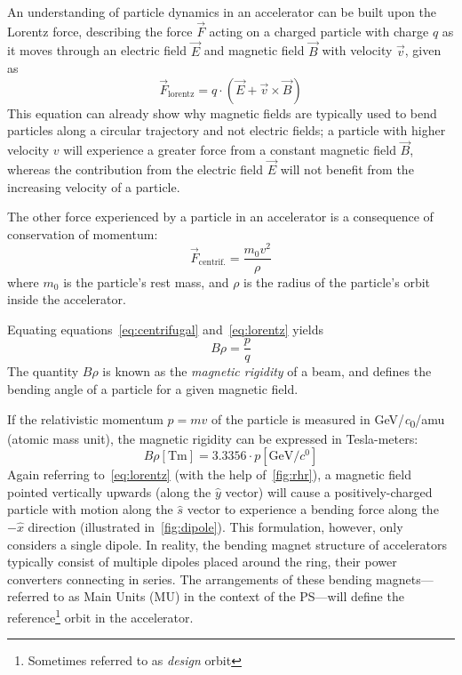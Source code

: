 \documentclass[11pt]{report}
\begin{document}
An understanding of particle dynamics in an accelerator can be built upon the Lorentz force, describing the force $\vec F$ acting on a charged particle with charge $q$ as it moves through an electric field $\vec E$ and magnetic field $\vec B$ with velocity $\vec v$, given as
\begin{equation}
\vec F_{\text{lorentz}} = q\cdot(\vec E+ \vec v\times\vec B)\label{eq:lorentz}
\end{equation}
This equation can already show why magnetic fields are typically used to bend particles along a circular trajectory and not electric fields; a particle with higher velocity $v$ will experience a greater force from a constant magnetic field $\vec B$, whereas the contribution from the electric field $\vec E$ will not benefit from the increasing velocity of a particle.

The other force experienced by a particle in an accelerator is a consequence of conservation of momentum:
\begin{equation}
\vec F_{\text{centrif.}}=\frac{m_0v^2}{\rho}\label{eq:centrifugal}
\end{equation} where $m_0$ is the particle's rest mass, and $\rho$ is the radius of the particle's orbit inside the accelerator.

Equating equations~\ref{eq:centrifugal} and~\ref{eq:lorentz} yields
\begin{equation}
B\rho=\frac pq
\label{eq:brho}
\end{equation}
The quantity $B\rho$ is known as the \textit{magnetic rigidity} of a beam, and defines the bending angle of a particle for a given magnetic field. 

If the relativistic momentum $p=mv$ of the particle is measured in \unit[per-mode = symbol]{\GeV\per\clight\per amu} (atomic mass unit), the magnetic rigidity can be expressed in Tesla-meters:
\begin{equation}
B\rho \left[\unit{\tesla\meter}\right] = 3.3356\cdot p\left[\unit{\giga\electronvolt\per\clight}\right]
\label{tesla-meters}
\end{equation} %
Again referring to~\autoref{eq:lorentz} (with the help of~\autoref{fig:rhr}), a magnetic field pointed vertically upwards (along the $\hat y$ vector) will cause a positively-charged particle with motion along the $\hat s$ vector to experience a bending force along the $-\hat x$ direction (illustrated in~\autoref{fig:dipole}). This formulation, however, only considers a single dipole. In reality, the bending magnet structure of accelerators typically consist of multiple dipoles placed around the ring, their power converters connecting in series. The arrangements of these bending magnets---referred to as Main Units (MU) in the context of the PS---will define the reference\footnote{Sometimes referred to as \textit{design} orbit} orbit in the accelerator.
\end{document}
